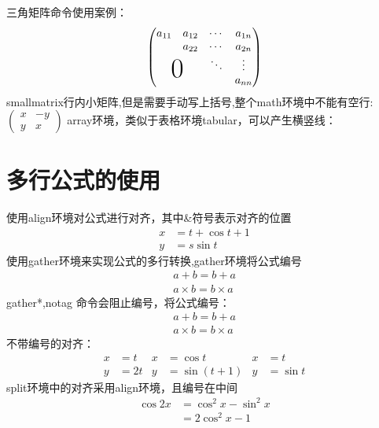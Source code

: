 \documentclass{ctexart}
\begin{document}
    三角矩阵命令使用案例：
    \[
      \begin{pmatrix}
          a_{11} & a_{12} & \cdots &a_{1n} \\
                 & a_{22} & \cdots & a_{2n} \\
                 &        & \ddots & \vdots \\
        \multicolumn{2}{c}{\raisebox{1.3ex}[0pt]{\Huge 0}} &    &a_{nn}
      \end{pmatrix}  
    \]
    smallmatrix行内小矩阵,但是需要手动写上括号,整个math环境中不能有空行:
      \begin{math}
        \left(
            \begin{smallmatrix}
                x&-y \\
                y&x
            \end{smallmatrix}
        \right)
      \end{math}
    array环境，类似于表格环境tabular，可以产生横竖线：  

    \section{多行公式的使用}
    使用align环境对公式进行对齐，其中\&符号表示对齐的位置
    \begin{align}
        x &= t+ \cos t +1 \\
        y &= s\sin t
    \end{align}
    使用gather环境来实现公式的多行转换,gather环境将公式编号
    \begin{gather}
        a+b =b+a \\
        a\times b= b\times a
    \end{gather}
    gather*,notag 命令会阻止编号，将公式编号：
    \begin{gather*}
        a+b =b+a \\
        a\times b= b\times a
    \end{gather*}
    不带编号的对齐：
    \begin{align*}
        x &=t   &   x&=\cos t       &   x&=t \\
        y &=2t  &   y&=\sin(t+1)    &   y&= \sin t 
    \end{align*}
    split环境中的对齐采用align环境，且编号在中间
    \begin{equation}
        \begin{split}
            \cos 2x &= \cos^2 x-\sin^2 x \\
                    &= 2\cos^2 x - 1
        \end{split}
    \end{equation}
\end{document}
